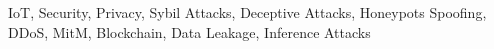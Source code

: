 
\begin{IEEEkeywords}
IoT, Security, Privacy, Sybil Attacks, Deceptive Attacks, Honeypots Spoofing, DDoS, MitM, Blockchain, Data Leakage, Inference Attacks
\end{IEEEkeywords}
